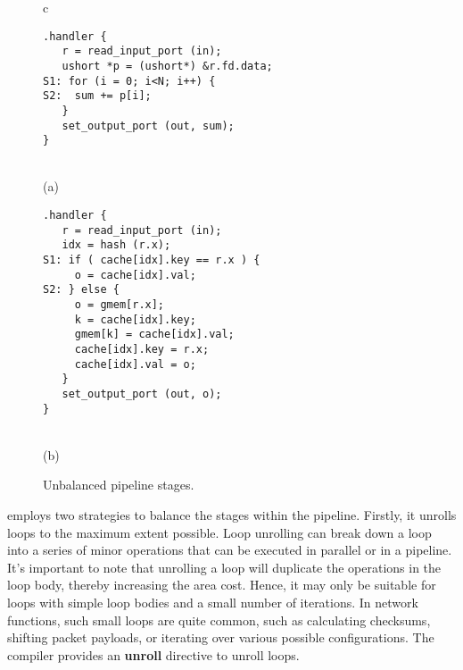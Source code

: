 \begin{figure}
\lstset{style=numbers}

\centering

\begin{tabular}{c}
{
\small
\begin{lstlisting}[escapechar=@]
.handler {
   r = read_input_port (in);
   ushort *p = (ushort*) &r.fd.data;
S1: for (i = 0; i<N; i++) {
S2:  sum += p[i];
   }
   set_output_port (out, sum);
}
\end{lstlisting} 
} \\
(a) \vspace{3pt} \\
{
\small 
\begin{lstlisting}[escapechar=@]
.handler {
   r = read_input_port (in);
   idx = hash (r.x);
S1: if ( cache[idx].key == r.x ) {
     o = cache[idx].val;
S2: } else {
     o = gmem[r.x];
     k = cache[idx].key;
     gmem[k] = cache[idx].val;
     cache[idx].key = r.x;
     cache[idx].val = o;
   }
   set_output_port (out, o);
}
\end{lstlisting} 
} \\
(b) \vspace{3pt} 
\end{tabular}

\caption{Unbalanced pipeline stages.}
\label{clicknp:fig:unbalance}

\end{figure}

\name employs two strategies to balance the stages within the pipeline. Firstly, it unrolls loops to the maximum extent possible. 
Loop unrolling can break down a loop into a series of minor operations that can be executed in parallel or in a pipeline.
It's important to note that unrolling a loop will duplicate the operations in the loop body, thereby increasing the area cost.
Hence, it may only be suitable for loops with simple loop bodies and a small number of iterations.
In network functions, such small loops are quite common, such as calculating checksums, shifting packet payloads, or iterating over various possible configurations.
The \name{} compiler provides an \textbf {unroll} directive to unroll loops.

